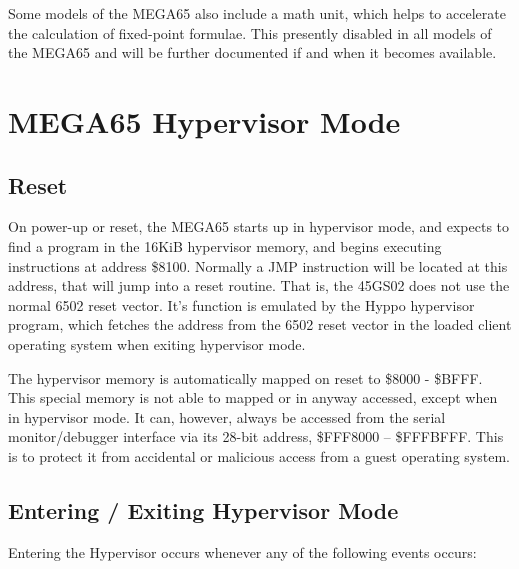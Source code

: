 Some models of the MEGA65 also include a math unit, which helps to accelerate the calculation of fixed-point formulae.
This presently disabled in all models of the MEGA65 and will be further documented if and when it becomes
available.



\section{MEGA65 Hypervisor Mode}
\label{sec:hypervisor-mode}

\subsection{Reset}

On power-up or reset, the MEGA65 starts up in hypervisor mode, and expects to find a program in the
16KiB hypervisor memory, and begins executing instructions at address \$8100.  Normally a JMP instruction
will be located at this address, that will jump into a reset routine. That is, the 45GS02
does not use the normal 6502 reset vector. It's function is emulated by the Hyppo hypervisor program,
which fetches the address from the 6502 reset vector in the loaded client operating system when
exiting hypervisor mode.

The hypervisor memory is automatically mapped on reset to \$8000 - \$BFFF.  This special memory is not
able to mapped or in anyway accessed, except when in hypervisor mode. It can, however, always be accessed from the serial monitor/debugger
interface via its 28-bit address, \$FFF8000 -- \$FFFBFFF.  This is to protect it from accidental or malicious access from a guest operating system.

\subsection{Entering / Exiting Hypervisor Mode}

Entering the Hypervisor occurs whenever any of the following events occurs:

